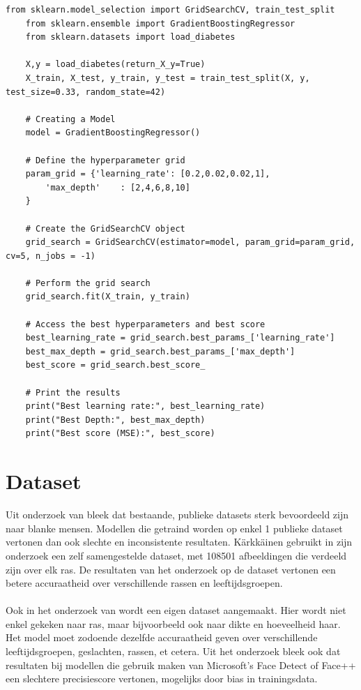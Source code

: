 \begin{lstlisting}[style=mystyle, caption={GridSearchCV}]
    from sklearn.model_selection import GridSearchCV, train_test_split
    from sklearn.ensemble import GradientBoostingRegressor
    from sklearn.datasets import load_diabetes
    
    X,y = load_diabetes(return_X_y=True)
    X_train, X_test, y_train, y_test = train_test_split(X, y, test_size=0.33, random_state=42)
    
    # Creating a Model
    model = GradientBoostingRegressor()
    
    # Define the hyperparameter grid
    param_grid = {'learning_rate': [0.2,0.02,0.02,1],
        'max_depth'    : [2,4,6,8,10]
    }
    
    # Create the GridSearchCV object
    grid_search = GridSearchCV(estimator=model, param_grid=param_grid, cv=5, n_jobs = -1)
    
    # Perform the grid search
    grid_search.fit(X_train, y_train)
    
    # Access the best hyperparameters and best score
    best_learning_rate = grid_search.best_params_['learning_rate']
    best_max_depth = grid_search.best_params_['max_depth']
    best_score = grid_search.best_score_
    
    # Print the results
    print("Best learning rate:", best_learning_rate)
    print("Best Depth:", best_max_depth)
    print("Best score (MSE):", best_score)
\end{lstlisting}


\section{Dataset} \label{sec:dataset}
Uit onderzoek van \textcite{Karkkainen2021} bleek dat bestaande, publieke datasets sterk bevoordeeld zijn naar blanke mensen. Modellen die getraind worden op enkel 1 publieke dataset vertonen dan ook slechte en inconsistente resultaten. Kärkkäinen gebruikt in zijn onderzoek een zelf samengestelde dataset, met 108501 afbeeldingen die verdeeld zijn over elk ras. De resultaten van het onderzoek op de dataset vertonen een betere accuraatheid over verschillende rassen en leeftijdsgroepen. \\
\\
Ook in het onderzoek van \textcite{Buolamwini2018} wordt een eigen dataset aangemaakt. Hier wordt niet enkel gekeken naar ras, maar bijvoorbeeld ook naar dikte en hoeveelheid haar. Het model moet zodoende dezelfde accuraatheid geven over verschillende leeftijdsgroepen, geslachten, rassen, et cetera. Uit het onderzoek bleek ook dat resultaten bij modellen die gebruik maken van Microsoft's Face Detect of Face++ een slechtere precisiescore vertonen, mogelijks door bias in trainingsdata.


